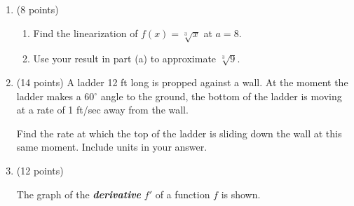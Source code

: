 \documentclass[11pt]{article}
\begin{document}
\newpage
\vspace*{-0.3in}
\begin{enumerate}
\item (8 points)

\begin{enumerate}

\item Find the linearization of $f(x) = \sqrt[3]{x}$ at $a = 8$.

\vfill

\item Use your result in part (a) to approximate $\sqrt[3]{9}$.
\vfill
\end{enumerate}
\newpage
\item (14 points) A ladder 12 ft long is propped against a wall. At the moment the ladder makes a 60$^\circ$ angle to the ground, the bottom of the ladder is moving at a rate of 1 ft/sec away from the wall.


Find the rate at which the top of the ladder is sliding down the wall at this same moment. Include units in your answer.

\vskip1in

\newpage

\item (12 points)


The graph of the \textit{\textbf{derivative}} $f'$ of a function $f$ is shown.


\end{enumerate}
\end{document}
